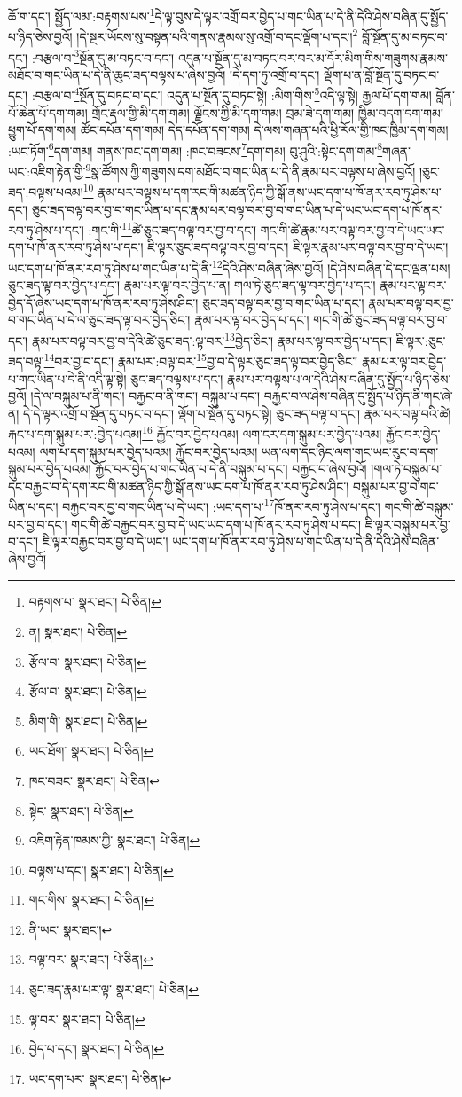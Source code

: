 ཆོ་ག་དང་། སྤྱོད་ལམ་:བརྟགས་པས་\footnote{བརྟགས་པ་  སྣར་ཐང་།  པེ་ཅིན། }དེ་ལྟ་བུས་དེ་ལྟར་འགྲོ་བར་བྱེད་པ་གང་ཡིན་པ་དེ་ནི་དེའི་ཤེས་བཞིན་དུ་སྤྱོད་པ་ཉིད་ཅེས་བྱའོ། །དེ་སྔར་ཡོངས་སུ་བསྟན་པའི་གནས་རྣམས་སུ་འགྲོ་བ་དང་ལྡོག་པ་དང་།\footnote{ན།  སྣར་ཐང་།  པེ་ཅིན། } བློ་སྔོན་དུ་མ་བཏང་བ་དང་། :བརྩལ་བ་\footnote{རྩོལ་བ་  སྣར་ཐང་།  པེ་ཅིན། }སྔོན་དུ་མ་བཏང་བ་དང་། འདུན་པ་སྔོན་དུ་མ་བཏང་བར་བར་མ་དོར་མིག་གིས་གཟུགས་རྣམས་མཐོང་བ་གང་ཡིན་པ་དེ་ནི་ཆུང་ཟད་བལྟས་པ་ཞེས་བྱའོ། །དེ་དག་ཏུ་འགྲོ་བ་དང་། ལྡོག་པ་ན་བློ་སྔོན་དུ་བཏང་བ་དང་། :བརྩལ་བ་\footnote{རྩོལ་བ་  སྣར་ཐང་།  པེ་ཅིན། }སྔོན་དུ་བཏང་བ་དང་། འདུན་པ་སྔོན་དུ་བཏང་སྟེ། :མིག་གིས་\footnote{མིག་གི་  སྣར་ཐང་།  པེ་ཅིན། }འདི་ལྟ་སྟེ། རྒྱལ་པོ་དག་གམ། བློན་པོ་ཆེན་པོ་དག་གམ། གྲོང་རྡལ་གྱི་མི་དག་གམ། ལྗོངས་ཀྱི་མི་དག་གམ། བྲམ་ཟེ་དག་གམ། ཁྱིམ་བདག་དག་གམ། ཕྱུག་པོ་དག་གམ། ཚོང་དཔོན་དག་གམ། དེད་དཔོན་དག་གམ། དེ་ལས་གཞན་པའི་ཕྱི་རོལ་གྱི་ཁང་ཁྱིམ་དག་གམ། :ཡང་ཏོག་\footnote{ཡང་ཐོག་  སྣར་ཐང་།  པེ་ཅིན། }དག་གམ། གནས་ཁང་དག་གམ། :ཁང་བཟངས་\footnote{ཁང་བཟང་  སྣར་ཐང་།  པེ་ཅིན། }དག་གམ། བུ་ཤུའི་:སྟེང་དག་གམ་\footnote{སྟེང་  སྣར་ཐང་།  པེ་ཅིན། }གཞན་ཡང་:འཇིག་རྟེན་གྱི་\footnote{འཇིག་རྟེན་ཁམས་ཀྱི་  སྣར་ཐང་།  པེ་ཅིན། }སྣ་ཚོགས་ཀྱི་གཟུགས་དག་མཐོང་བ་གང་ཡིན་པ་དེ་ནི་རྣམ་པར་བལྟས་པ་ཞེས་བྱའོ། །ཅུང་ཟད་:བལྟས་པའམ།\footnote{བལྟས་པ་དང་།  སྣར་ཐང་།  པེ་ཅིན། } རྣམ་པར་བལྟས་པ་དག་རང་གི་མཚན་ཉིད་ཀྱི་སྒོ་ནས་ཡང་དག་པ་ཁོ་ནར་རབ་ཏུ་ཤེས་པ་དང་། ཅུང་ཟད་བལྟ་བར་བྱ་བ་གང་ཡིན་པ་དང་རྣམ་པར་བལྟ་བར་བྱ་བ་གང་ཡིན་པ་དེ་ཡང་ཡང་དག་པ་ཁོ་ནར་རབ་ཏུ་ཤེས་པ་དང་། :གང་གི་\footnote{གང་གིས་  སྣར་ཐང་།  པེ་ཅིན། }ཚེ་ཅུང་ཟད་བལྟ་བར་བྱ་བ་དང་། གང་གི་ཚེ་རྣམ་པར་བལྟ་བར་བྱ་བ་དེ་ཡང་ཡང་དག་པ་ཁོ་ནར་རབ་ཏུ་ཤེས་པ་དང་། ཇི་ལྟར་ཅུང་ཟད་བལྟ་བར་བྱ་བ་དང་། ཇི་ལྟར་རྣམ་པར་བལྟ་བར་བྱ་བ་དེ་ཡང་། ཡང་དག་པ་ཁོ་ནར་རབ་ཏུ་ཤེས་པ་གང་ཡིན་པ་དེ་ནི་\footnote{ནི་ཡང་  སྣར་ཐང་། }དེའི་ཤེས་བཞིན་ཞེས་བྱའོ། །དེ་ཤེས་བཞིན་དེ་དང་ལྡན་པས། ཅུང་ཟད་ལྟ་བར་བྱེད་པ་དང་། རྣམ་པར་ལྟ་བར་བྱེད་པ་ན། གལ་ཏེ་ཅུང་ཟད་ལྟ་བར་བྱེད་པ་དང་། རྣམ་པར་ལྟ་བར་བྱེད་དོ་ཞེས་ཡང་དག་པ་ཁོ་ནར་རབ་ཏུ་ཤེས་ཤིང་། ཅུང་ཟད་བལྟ་བར་བྱ་བ་གང་ཡིན་པ་དང་། རྣམ་པར་བལྟ་བར་བྱ་བ་གང་ཡིན་པ་དེ་ལ་ཅུང་ཟད་ལྟ་བར་བྱེད་ཅིང་། རྣམ་པར་ལྟ་བར་བྱེད་པ་དང་། གང་གི་ཚེ་ཅུང་ཟད་བལྟ་བར་བྱ་བ་དང་། རྣམ་པར་བལྟ་བར་བྱ་བ་དེའི་ཚེ་ཅུང་ཟད་:ལྟ་བར་\footnote{བལྟ་བར་  སྣར་ཐང་།  པེ་ཅིན། }བྱེད་ཅིང་། རྣམ་པར་ལྟ་བར་བྱེད་པ་དང་། ཇི་ལྟར་:ཅུང་ཟད་བལྟ་\footnote{ཅུང་ཟད་རྣམ་པར་ལྟ་  སྣར་ཐང་།  པེ་ཅིན། }བར་བྱ་བ་དང་། རྣམ་པར་:བལྟ་བར་\footnote{ལྟ་བར་  སྣར་ཐང་།  པེ་ཅིན། }བྱ་བ་དེ་ལྟར་ཅུང་ཟད་ལྟ་བར་བྱེད་ཅིང་། རྣམ་པར་ལྟ་བར་བྱེད་པ་གང་ཡིན་པ་དེ་ནི་འདི་ལྟ་སྟེ། ཅུང་ཟད་བལྟས་པ་དང་། རྣམ་པར་བལྟས་པ་ལ་དེའི་ཤེས་བཞིན་དུ་སྤྱོད་པ་ཉིད་ཅེས་བྱའོ། །དེ་ལ་བསྐུམ་པ་ནི་གང་། བརྐྱང་བ་ནི་གང་། བསྐུམ་པ་དང་། བརྐྱང་བ་ལ་ཤེས་བཞིན་དུ་སྤྱོད་པ་ཉིད་ནི་གང་ཞེ་ན། དེ་དེ་ལྟར་འགྲོ་བ་སྔོན་དུ་བཏང་བ་དང་། ལྡོག་པ་སྔོན་དུ་བཏང་སྟེ། ཅུང་ཟད་བལྟ་བ་དང་། རྣམ་པར་བལྟ་བའི་ཚེ། རྐང་པ་དག་སྐུམ་པར་:བྱེད་པའམ།\footnote{བྱེད་པ་དང་།  སྣར་ཐང་།  པེ་ཅིན། } རྐྱོང་བར་བྱེད་པའམ། ལག་ངར་དག་སྐུམ་པར་བྱེད་པའམ། རྐྱོང་བར་བྱེད་པའམ། ལག་པ་དག་སྐུམ་པར་བྱེད་པའམ། རྐྱོང་བར་བྱེད་པའམ། ཡན་ལག་དང་ཉིང་ལག་གང་ཡང་རུང་བ་དག་སྐུམ་པར་བྱེད་པའམ། རྐྱོང་བར་བྱེད་པ་གང་ཡིན་པ་དེ་ནི་བསྐུམ་པ་དང་། བརྐྱང་བ་ཞེས་བྱའོ། །གལ་ཏེ་བསྐུམ་པ་དང་བརྐྱང་བ་དེ་དག་རང་གི་མཚན་ཉིད་ཀྱི་སྒོ་ནས་ཡང་དག་པ་ཁོ་ནར་རབ་ཏུ་ཤེས་ཤིང་། བསྐུམ་པར་བྱ་བ་གང་ཡིན་པ་དང་། བརྐྱང་བར་བྱ་བ་གང་ཡིན་པ་དེ་ཡང་། :ཡང་དག་པ་\footnote{ཡང་དག་པར་  སྣར་ཐང་།  པེ་ཅིན། }ཁོ་ནར་རབ་ཏུ་ཤེས་པ་དང་། གང་གི་ཚེ་བསྐུམ་པར་བྱ་བ་དང་། གང་གི་ཚེ་བརྐྱང་བར་བྱ་བ་དེ་ཡང་ཡང་དག་པ་ཁོ་ནར་རབ་ཏུ་ཤེས་པ་དང་། ཇི་ལྟར་བསྐུམ་པར་བྱ་བ་དང་། ཇི་ལྟར་བརྐྱང་བར་བྱ་བ་དེ་ཡང་། ཡང་དག་པ་ཁོ་ནར་རབ་ཏུ་ཤེས་པ་གང་ཡིན་པ་དེ་ནི་དེའི་ཤེས་བཞིན་ཞེས་བྱའོ། 